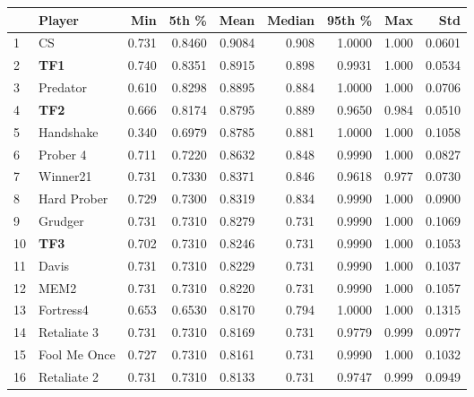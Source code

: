 \begin{tabular}{llrrrrrrr}
\toprule
{} &        Player &    Min &   5th \% &    Mean &  Median &  95th \% &    Max &     Std \\
\midrule
1  &            CS &  0.731 &  0.8460 &  0.9084 &   0.908 &  1.0000 &  1.000 &  0.0601 \\
2  &           \textbf{TF1} &  0.740 &  0.8351 &  0.8915 &   0.898 &  0.9931 &  1.000 &  0.0534 \\
3  &      Predator &  0.610 &  0.8298 &  0.8895 &   0.884 &  1.0000 &  1.000 &  0.0706 \\
4  &           \textbf{TF2} &  0.666 &  0.8174 &  0.8795 &   0.889 &  0.9650 &  0.984 &  0.0510 \\
5  &     Handshake &  0.340 &  0.6979 &  0.8785 &   0.881 &  1.0000 &  1.000 &  0.1058 \\
6  &      Prober 4 &  0.711 &  0.7220 &  0.8632 &   0.848 &  0.9990 &  1.000 &  0.0827 \\
7  &      Winner21 &  0.731 &  0.7330 &  0.8371 &   0.846 &  0.9618 &  0.977 &  0.0730 \\
8  &   Hard Prober &  0.729 &  0.7300 &  0.8319 &   0.834 &  0.9990 &  1.000 &  0.0900 \\
9  &       Grudger &  0.731 &  0.7310 &  0.8279 &   0.731 &  0.9990 &  1.000 &  0.1069 \\
10 &           \textbf{TF3} &  0.702 &  0.7310 &  0.8246 &   0.731 &  0.9990 &  1.000 &  0.1053 \\
11 &         Davis &  0.731 &  0.7310 &  0.8229 &   0.731 &  0.9990 &  1.000 &  0.1037 \\
12 &          MEM2 &  0.731 &  0.7310 &  0.8220 &   0.731 &  0.9990 &  1.000 &  0.1057 \\
13 &     Fortress4 &  0.653 &  0.6530 &  0.8170 &   0.794 &  1.0000 &  1.000 &  0.1315 \\
14 &   Retaliate 3 &  0.731 &  0.7310 &  0.8169 &   0.731 &  0.9779 &  0.999 &  0.0977 \\
15 &  Fool Me Once &  0.727 &  0.7310 &  0.8161 &   0.731 &  0.9990 &  1.000 &  0.1032 \\
16 &   Retaliate 2 &  0.731 &  0.7310 &  0.8133 &   0.731 &  0.9747 &  0.999 &  0.0949 \\
\bottomrule
\end{tabular}
